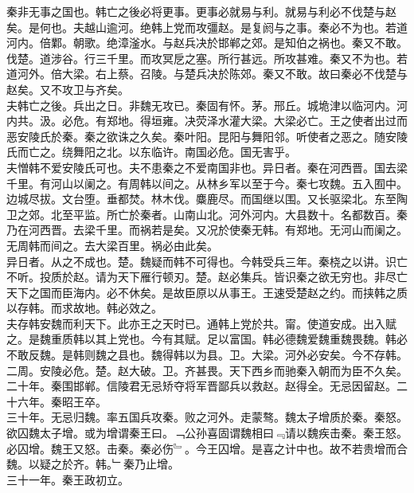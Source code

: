 \documentclass{zhvt-classic}
\begin{document}
\hspace*{2em}秦非无事之国也。韩亡之後必将更事。更事必就易与利。就易与利必不伐楚与赵矣。是何也。夫越山逾河。绝韩上党而攻彊赵。是复阏与之事。秦必不为也。若道河内。倍鄴。朝歌。绝漳滏水。与赵兵决於邯郸之郊。是知伯之祸也。秦又不敢。伐楚。道涉谷。行三千里。而攻冥戹之塞。所行甚远。所攻甚难。秦又不为也。若道河外。倍大梁。右上蔡。召陵。与楚兵决於陈郊。秦又不敢。故曰秦必不伐楚与赵矣。又不攻卫与齐矣。\\
\hspace*{2em}夫韩亡之後。兵出之日。非魏无攻已。秦固有怀。茅。邢丘。城垝津以临河内。河内共。汲。必危。有郑地。得垣雍。决荧泽水灌大梁。大梁必亡。王之使者出过而恶安陵氏於秦。秦之欲诛之久矣。秦叶阳。昆阳与舞阳邻。听使者之恶之。随安陵氏而亡之。绕舞阳之北。以东临许。南国必危。国无害乎。\\
\hspace*{2em}夫憎韩不爱安陵氏可也。夫不患秦之不爱南国非也。异日者。秦在河西晋。国去梁千里。有河山以阑之。有周韩以间之。从林乡军以至于今。秦七攻魏。五入囿中。边城尽拔。文台堕。垂都焚。林木伐。麋鹿尽。而国继以围。又长驱梁北。东至陶卫之郊。北至平监。所亡於秦者。山南山北。河外河内。大县数十。名都数百。秦乃在河西晋。去梁千里。而祸若是矣。又况於使秦无韩。有郑地。无河山而阑之。无周韩而间之。去大梁百里。祸必由此矣。\\
\hspace*{2em}异日者。从之不成也。楚。魏疑而韩不可得也。今韩受兵三年。秦桡之以讲。识亡不听。投质於赵。请为天下雁行顿刃。楚。赵必集兵。皆识秦之欲无穷也。非尽亡天下之国而臣海内。必不休矣。是故臣原以从事王。王速受楚赵之约。而挟韩之质以存韩。而求故地。韩必效之。\\
\hspace*{2em}夫存韩安魏而利天下。此亦王之天时已。通韩上党於共。甯。使道安成。出入赋之。是魏重质韩以其上党也。今有其赋。足以富国。韩必德魏爱魏重魏畏魏。韩必不敢反魏。是韩则魏之县也。魏得韩以为县。卫。大梁。河外必安矣。今不存韩。二周。安陵必危。楚。赵大破。卫。齐甚畏。天下西乡而驰秦入朝而为臣不久矣。\\
\hspace*{2em}二十年。秦围邯郸。信陵君无忌矫夺将军晋鄙兵以救赵。赵得全。无忌因留赵。二十六年。秦昭王卒。\\
\hspace*{2em}三十年。无忌归魏。率五国兵攻秦。败之河外。走蒙骜。魏太子增质於秦。秦怒。欲囚魏太子增。或为增谓秦王曰。﹁公孙喜固谓魏相曰﹃请以魏疾击秦。秦王怒。必囚增。魏王又怒。击秦。秦必伤﹄。今王囚增。是喜之计中也。故不若贵增而合魏。以疑之於齐。韩。﹂秦乃止增。\\
\hspace*{2em}三十一年。秦王政初立。\\
\end{document}

